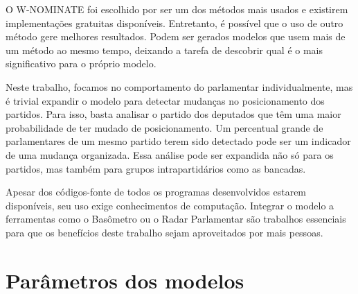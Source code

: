 \documentclass[a4paper,titlepage]{ppgi}\usepackage[]{graphicx}\usepackage[]{color}
\begin{document}
O W-NOMINATE foi escolhido por ser um dos métodos mais usados e existirem
implementações gratuitas disponíveis. Entretanto, é possível que o uso de outro
método gere melhores resultados. Podem ser gerados modelos que usem mais de um
método ao mesmo tempo, deixando a tarefa de descobrir qual é o mais
significativo para o próprio modelo.

Neste trabalho, focamos no comportamento do parlamentar individualmente, mas é
trivial expandir o modelo para detectar mudanças no posicionamento dos
partidos. Para isso, basta analisar o partido dos deputados que têm uma maior
probabilidade de ter mudado de posicionamento. Um percentual grande de
parlamentares de um mesmo partido terem sido detectado pode ser um indicador de
uma mudança organizada. Essa análise pode ser expandida não só para os
partidos, mas também para grupos intrapartidários como as bancadas.

Apesar dos códigos-fonte de todos os programas desenvolvidos estarem
disponíveis, seu uso exige conhecimentos de computação. Integrar o modelo a
ferramentas como o Basômetro ou o Radar Parlamentar são trabalhos essenciais
para que os benefícios deste trabalho sejam aproveitados por mais pessoas.





\appendix


\chapter{Parâmetros dos modelos}
\label{apendice:parametros-modelos}
\end{document}
